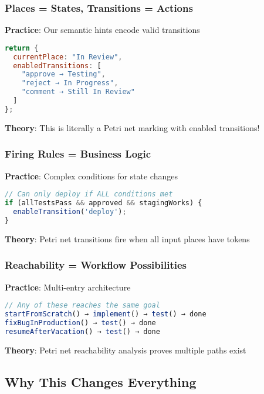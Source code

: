 \documentclass[11pt,a4paper]{article}
\begin{document}
\subsubsection{Places = States, Transitions = Actions}

\textbf{Practice}: Our semantic hints encode valid transitions

\begin{lstlisting}[language=JavaScript]
return {
  currentPlace: "In Review",
  enabledTransitions: [
    "approve → Testing",
    "reject → In Progress",
    "comment → Still In Review"
  ]
};
\end{lstlisting}

\textbf{Theory}: This is literally a Petri net marking with enabled transitions!

\subsubsection{Firing Rules = Business Logic}

\textbf{Practice}: Complex conditions for state changes

\begin{lstlisting}[language=JavaScript]
// Can only deploy if ALL conditions met
if (allTestsPass && approved && stagingWorks) {
  enableTransition('deploy');
}
\end{lstlisting}

\textbf{Theory}: Petri net transitions fire when all input places have tokens

\subsubsection{Reachability = Workflow Possibilities}

\textbf{Practice}: Multi-entry architecture

\begin{lstlisting}[language=JavaScript]
// Any of these reaches the same goal
startFromScratch() → implement() → test() → done
fixBugInProduction() → test() → done  
resumeAfterVacation() → test() → done
\end{lstlisting}

\textbf{Theory}: Petri net reachability analysis proves multiple paths exist

\subsection{Why This Changes Everything}
\end{document}
